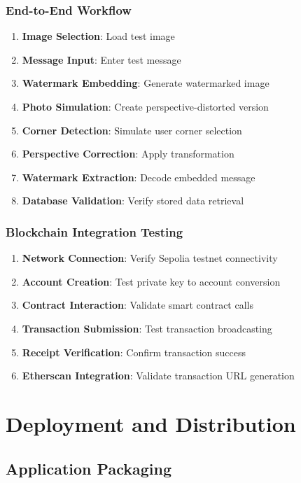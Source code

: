 \documentclass[12pt,a4paper]{article}
\begin{document}
\subsubsection{End-to-End Workflow}
\begin{enumerate}
    \item \textbf{Image Selection}: Load test image
    \item \textbf{Message Input}: Enter test message
    \item \textbf{Watermark Embedding}: Generate watermarked image
    \item \textbf{Photo Simulation}: Create perspective-distorted version
    \item \textbf{Corner Detection}: Simulate user corner selection
    \item \textbf{Perspective Correction}: Apply transformation
    \item \textbf{Watermark Extraction}: Decode embedded message
    \item \textbf{Database Validation}: Verify stored data retrieval
\end{enumerate}

\subsubsection{Blockchain Integration Testing}
\begin{enumerate}
    \item \textbf{Network Connection}: Verify Sepolia testnet connectivity
    \item \textbf{Account Creation}: Test private key to account conversion
    \item \textbf{Contract Interaction}: Validate smart contract calls
    \item \textbf{Transaction Submission}: Test transaction broadcasting
    \item \textbf{Receipt Verification}: Confirm transaction success
    \item \textbf{Etherscan Integration}: Validate transaction URL generation
\end{enumerate}

\section{Deployment and Distribution}

\subsection{Application Packaging}
\end{document}
